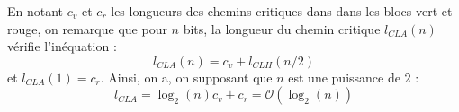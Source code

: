 En notant $c_v$ et $c_r$ les longueurs des chemins critiques dans dans les blocs vert et rouge, on remarque que pour $n$ bits, la longueur du chemin critique $l_{CLA}(n)$ vérifie l’inéquation :
$$
l_{CLA}(n)= c_v + l_{CLH}(n/2)
$$
et $l_{CLA}(1)=c_r$. Ainsi, on a, on supposant que $n$ est une puissance de $2$ :
$$
l_{CLA} =  \log_2(n)c_v + c_r = \mathcal{O}(\log_2(n))
$$
